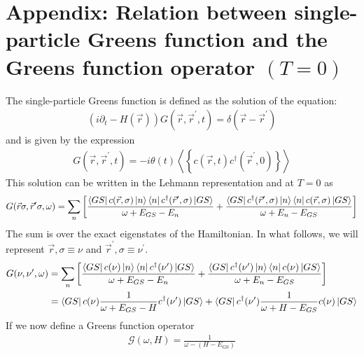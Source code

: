 \documentclass[12pt]{article}
\numberwithin{equation}{section}
\begin{document}
\section*{Appendix: Relation between single-particle Greens function and the Greens function operator $(T=0)$}
 The single-particle Greens function is defined as the solution of the equation:
 \begin{equation}\begin{aligned}
	 \left(i\partial_t - H(\vec r)\right)G(\vec r,\vec r^\prime, t) = \delta(\vec r - \vec r^\prime)
 \end{aligned}\end{equation}
 and is given by the expression
 \begin{equation}\begin{aligned}
	 G(\vec r,\vec r^\prime, t) = -i \theta(t) \left< \left\{ c(\vec r, t) c^\dagger(\vec r^\prime, 0)\right\} \right>
 \end{aligned}\end{equation}
 This solution can be written in the Lehmann representation  and at $T=0$ as
 \begin{equation}\begin{aligned}
	 G(\vec r \sigma, \vec r^\prime \sigma, \omega) = \sum_{n}\left[\frac{\bra{GS}c({\vec r,\sigma})\ket{n}\bra{n}c^\dagger(\vec r^\prime,\sigma)\ket{GS}}{\omega + E_{GS} - E_n} + \frac{\bra{GS}c^\dagger(\vec r^\prime,\sigma)\ket{n}\bra{n}c({\vec r,\sigma})\ket{GS}}{\omega + E_n - E_{GS}}\right]
 \end{aligned}\end{equation}
 The sum is over the exact eigenstates of the Hamiltonian. In what follows, we will represent $\vec r,\sigma \equiv \nu$ and $\vec r^\prime,\sigma \equiv \nu^\prime$.
 \begin{equation}\begin{aligned}
	 G(\nu, \nu^\prime, \omega) &= \sum_{n}\left[\frac{\bra{GS}c(\nu)\ket{n}\bra{n}c^\dagger(\nu^\prime)\ket{GS}}{\omega + E_{GS} - E_n} + \frac{\bra{GS}c^\dagger(\nu^\prime)\ket{n}\bra{n}c(\nu)\ket{GS}}{\omega + E_n - E_{GS}}\right]\\
							&= \bra{GS}c(\nu)\frac{1}{\omega + E_{GS} - H}c^\dagger(\nu^\prime)\ket{GS} + \bra{GS}c^\dagger(\nu^\prime)\frac{1}{\omega + H - E_{GS}}c(\nu)\ket{GS}\\
 \end{aligned}\end{equation}
 If we now define a Greens function operator
 \begin{equation}\begin{aligned}
	 \label{inv_G_func}
	 \mathcal{G}(\omega, H) = \frac{1}{\omega - (H - E_\text{GS})}
 \end{aligned}\end{equation}
\end{document}
